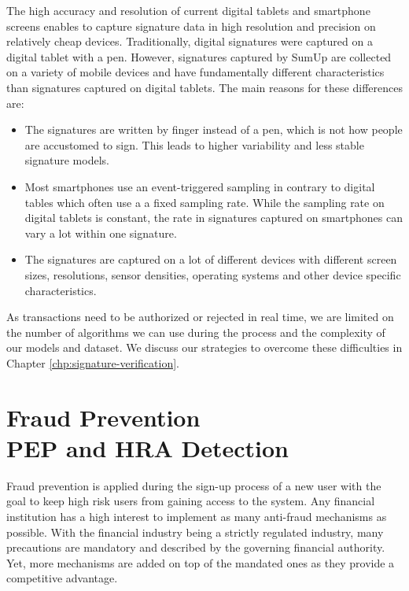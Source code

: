 \documentclass[a4paper, oneside]{csthesis}
\begin{document}
The high accuracy and resolution of current digital tablets and smartphone screens enables to capture signature data in high resolution and precision on relatively cheap devices.
Traditionally, digital signatures were captured on a digital tablet with a pen. However, signatures captured by SumUp are collected on a variety of mobile devices and have fundamentally different characteristics than signatures captured on digital tablets. The main reasons for these differences are:

\begin{itemize}
    \item The signatures are written by finger instead of a pen, which is not how people are accustomed to sign. This leads to higher variability and less stable signature models.
    \item Most smartphones use an event-triggered sampling in contrary to digital tables which often use a a fixed sampling rate. While the sampling rate on digital tablets is constant, the rate in signatures captured on smartphones can vary a lot within one signature.
    \item The signatures are captured on a lot of different devices with different screen sizes, resolutions, sensor densities, operating systems and other device specific characteristics.
\end{itemize}

As transactions need to be authorized or rejected in real time, we are limited on the number of algorithms we can use during the process and the complexity of our models and dataset.
We discuss our strategies to overcome these difficulties in Chapter \ref{chp:signature-verification}.




\chapter{Fraud Prevention \\PEP and HRA Detection}

Fraud prevention is applied during the sign-up process of a new user with the goal to keep high risk users from gaining access to the system.
Any financial institution has a high interest to implement as many anti-fraud mechanisms as possible. With the financial industry being a strictly regulated industry, many precautions are mandatory and described by the governing financial authority. Yet, more mechanisms are added on top of the mandated ones as they provide a competitive advantage.
\end{document}
